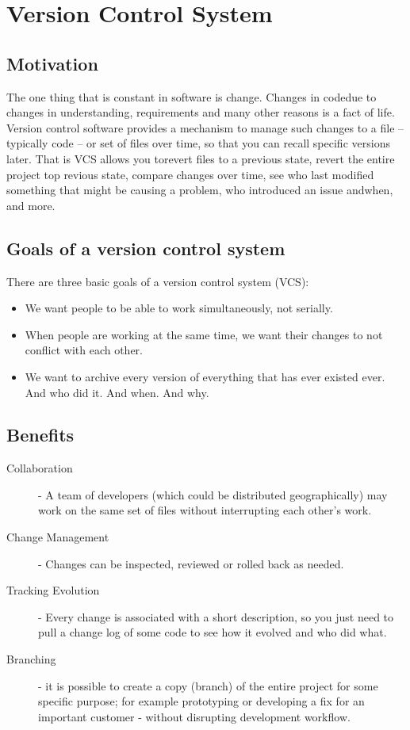 \documentclass{book}
\begin{document}
    \section*{Version Control System}
    \subsection*{Motivation}
    The one thing that is constant in software is change. Changes in codedue to changes in understanding, requirements and many other reasons is a fact of life. Version control software provides a mechanism to manage such changes to a file – typically code – or set of files over time, so that you can recall specific versions later. That is VCS allows you torevert files to a previous state, revert the entire project top revious state, compare changes over time, see who last modified something that might be causing a problem, who introduced an issue andwhen, and more.

    \subsection*{Goals of a version control system}
    There are three basic goals of a version control system (VCS):
    \begin{itemize}
        \item We want people to be able to work simultaneously, not serially.
        \item When people are working at the same time, we want their changes to not conflict with each other.
        \item We want to archive every version of everything that has ever existed ever. And who did it. And when. And why.
    \end{itemize}
    \subsection*{Benefits}
    \begin{description}
        \item [Collaboration] - A team of developers (which could be distributed geographically) may work on the same set of files without interrupting each other’s work.
        \item [Change Management] - Changes can be inspected, reviewed or rolled back as needed.
        \item [Tracking Evolution] - Every change is associated with a short description, so you just need to pull a change log of some code to see how it evolved and who did what.
        \item [Branching] - it is possible to create a copy (branch) of the entire project for some specific purpose; for example prototyping or developing a fix for an important customer - without disrupting development workflow.
    \end{description}
\end{document}

